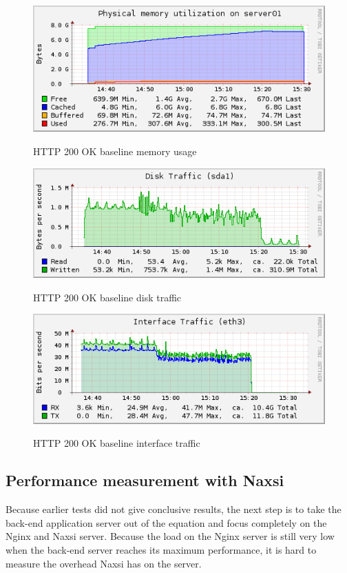 \documentclass[Measurements]{subfiles}
\begin{document}
\begin{figure}[H]
\centering
\caption{HTTP 200 OK baseline memory usage}
\includegraphics[scale=0.7]{images/results/baseline_200/memory.png}
\label{fig:Baseline Nginx memory usage}
\end{figure}

\begin{figure}[H]
\centering
\caption{HTTP 200 OK baseline disk traffic}
\includegraphics[scale=0.7]{images/results/baseline_200/disk.png}
\label{fig:Baseline Nginx disk traffic}
\end{figure}

\begin{figure}[H]
\centering
\caption{HTTP 200 OK baseline interface traffic}
\includegraphics[scale=0.7]{images/results/baseline_200/interface.png}
\label{fig:Baseline Nginx interface traffic}
\end{figure}

\subsection{Performance measurement with Naxsi}
Because earlier tests did not give conclusive results, the next step is to take the back-end application server out of the equation and focus completely on the Nginx and Naxsi server. Because the load on the Nginx server is still very low when the back-end server reaches its maximum performance, it is hard to measure the overhead Naxsi has on the server.
\end{document}
